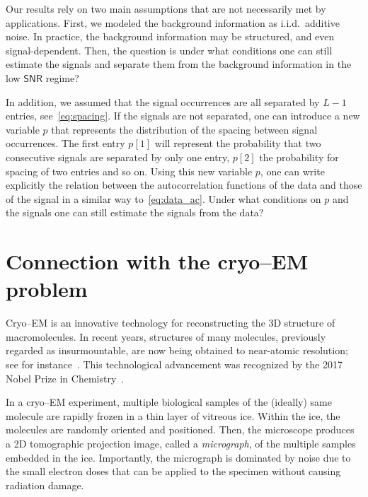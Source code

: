 \documentclass[english,11pt]{article}
\numberwithin{equation}{section}
\theoremstyle{plain}
\theoremstyle{definition}
\theoremstyle{remark}
\theoremstyle{plain}
\theoremstyle{remark}
\theoremstyle{plain}
\theoremstyle{plain}
\newcommand{\SNR}{{\textsf{SNR}}}
\begin{document}
Our results rely on two main assumptions that are not necessarily met by applications. 
First, we modeled the background information as i.i.d.\ additive noise. In practice,
the background information may be structured, and even signal-dependent. Then, the question is  under what conditions  
one can still estimate the signals and separate them from the background information in the low $\SNR$ regime? 

In addition, we assumed that the signal occurrences are all separated by $L-1$ entries, see~\eqref{eq:spacing}. If the signals are not separated, one can introduce a new variable $p$ that represents the distribution of the spacing between signal occurrences. The first entry $p[1]$ will represent the probability that two consecutive signals are separated by only one entry, $p[2]$ the probability for spacing of two entries and so on. Using this new variable $p$, one can write explicitly the relation between the autocorrelation functions of the data and those of the signal in a similar way to~\eqref{eq:data_ac}. Under what conditions on $p$ and the signals one can still estimate the signals from the data?


\section{Connection with the cryo--EM problem}	

Cryo--EM is an innovative technology for reconstructing the 3D structure of macromolecules. In recent years, structures
of many molecules, previously regarded as insurmountable, are now being
obtained to near-atomic resolution; see for instance~\cite{kuhlbrandt2014resolution,bartesaghi20152}. This technological advancement was recognized by the 2017 Nobel Prize in Chemistry~\cite{nobel}. 

In a cryo--EM experiment, multiple biological samples of the (ideally) same molecule are rapidly frozen in a thin layer of vitreous ice. Within the ice, the molecules are randomly oriented and positioned. Then,  the microscope produces a 2D tomographic projection image, called a \emph{micrograph}, of the multiple samples embedded in the ice. Importantly, the micrograph is dominated by noise due to the small electron doses that
can be applied to the specimen without causing radiation damage.
\end{document}

